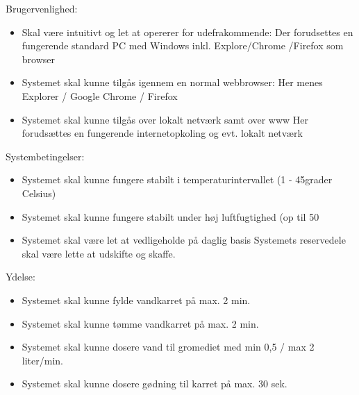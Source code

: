 Brugervenlighed:
\begin{itemize}
	\item Skal være intuitivt og let at opererer for udefrakommende:
	Der forudsettes en fungerende standard PC med Windows inkl. Explore/Chrome	/Firefox som browser

	\item Systemet skal kunne tilgås igennem en normal webbrowser:
		Her menes Explorer / Google Chrome / Firefox
	\item Systemet skal kunne tilgås over lokalt netværk samt over www
		Her forudsættes en fungerende internetopkoling og evt. lokalt netværk
\end{itemize}

Systembetingelser:
\begin{itemize}
	\item Systemet skal kunne fungere stabilt i temperaturintervallet (1 - 45grader Celsius)
	\item Systemet skal kunne fungere stabilt under høj luftfugtighed (op til 50%
	\item Systemet skal være let at vedligeholde på daglig basis
		Systemets reservedele skal være lette at udskifte og skaffe.
\end{itemize}

Ydelse:
\begin{itemize}
	\item Systemet skal kunne fylde vandkarret på max. 2 min.
	\item Systemet skal kunne tømme vandkarret på max. 2 min.
	\item Systemet skal kunne dosere vand til gromediet med min 0,5 / max 2 liter/min.
	\item Systemet skal kunne dosere gødning til karret på max. 30 sek.
\end{itemize}